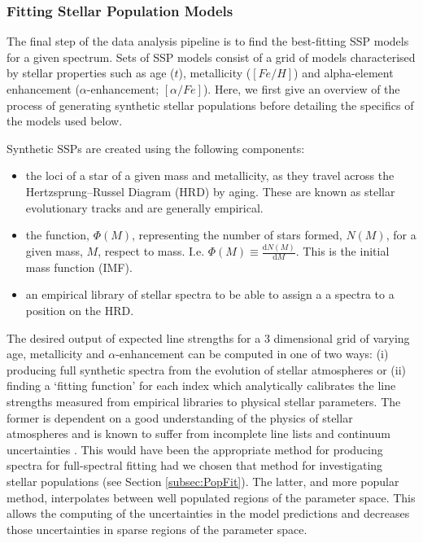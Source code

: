 		\subsubsection{Fitting Stellar Population Models}
			\label{subsubsec:StellarPop}
			The final step of the data analysis pipeline is to find the best-fitting SSP models for a given spectrum. Sets of SSP models consist of a grid of models characterised by stellar properties such as age ($t$), metallicity ($[Fe/H]$) and alpha-element enhancement ($\alpha$-enhancement; $[\alpha/Fe]$). Here, we first give an overview of the process of generating synthetic stellar populations before detailing the specifics of the models used below. 

			Synthetic SSPs are created using the following components:
			\begin{itemize}
				\item the loci of a star of a given mass and metallicity, as they travel across the Hertzsprung--Russel Diagram (HRD) by aging. These are known as stellar evolutionary tracks and are generally empirical.
				\item the function, $\Phi(M)$, representing the number of stars formed, $N(M)$, for a given mass, $M$, respect to mass. I.e. $\Phi(M) \equiv \frac{\mathrm{d}N(M)}{\mathrm{d}M}$. This is the initial mass function (IMF).
				\item an empirical library of stellar spectra to be able to assign a a spectra to a position on the HRD. 
			\end{itemize}
			The desired output of expected line strengths for a 3 dimensional grid of varying age, metallicity and $\alpha$-enhancement can be computed in one of two ways: (i) producing full synthetic spectra from the evolution of stellar atmospheres or (ii) finding a `fitting function' for each index which analytically calibrates the line strengths measured from empirical libraries to physical stellar parameters. The former is dependent on a good understanding of the physics of stellar atmospheres and is known to suffer from incomplete line lists and continuum uncertainties \citep{Thomas2004}. This would have been the appropriate method for producing spectra for full-spectral fitting had we chosen that method for investigating stellar populations (see Section \ref{subsec:PopFit}). The latter, and more popular method, interpolates between well populated regions of the parameter space. This allows the computing of the uncertainties in the model predictions and decreases those uncertainties in sparse regions of the parameter space. 

